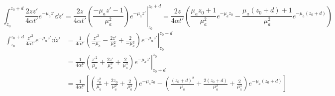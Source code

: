 \documentclass[]{article}
\begin{document}
\begin{equation*}
    \int_{z_0}^{z_0 + d}
   \frac{2zz'}{4\alpha t'} e^{-\mu_a z'}
   \dd z'
   = \left.\frac{2z}{4\alpha t'} \left(\frac{-\mu_az' - 1}{\mu_a^2} \right)e^{-\mu_a z'} \right|_{z_0}^{z_0 + d}
     = \frac{2z}{4\alpha t'} \left( \frac{\mu_a z_0 + 1}{\mu_a^2}e^{-\mu_a z_0} - \frac{\mu_a (z_0+d) + 1}{\mu_a^2}e^{-\mu_a (z_0+d)}\right)
\end{equation*}
\begin{align*}
    \int_{z_0}^{z_0 + d}
   \frac{z'^2}{4\alpha t'} e^{-\mu_a z'}
   \dd z'
   &= \left.\frac{1}{4\alpha t'} \left( \frac{z'^2}{-\mu_a} - \frac{2z'}{\mu_a^2} + \frac{2}{-\mu_a^3} \right)e^{-\mu_a z'} \right|_{z_0}^{z_0 + d} \\
   &= \left.\frac{1}{4\alpha t'} \left( \frac{z'^2}{\mu_a} + \frac{2z'}{\mu_a^2} + \frac{2}{\mu_a^3} \right)e^{-\mu_a z'} \right|_{z_0 + d}^{z_0} \\
   &=
   \frac{1}{4\alpha t'}\left[
   \left( \frac{z_0^2}{\mu_a} + \frac{2z_0}{\mu_a^2} + \frac{2}{\mu_a^3} \right)e^{-\mu_a z_0} -
   \left( \frac{(z_0 + d)^2}{\mu_a} + \frac{2(z_0 + d)}{\mu_a^2} + \frac{2}{\mu_a^3} \right)e^{-\mu_a (z_0+d)}
   \right]
\end{align*}
\end{document}
